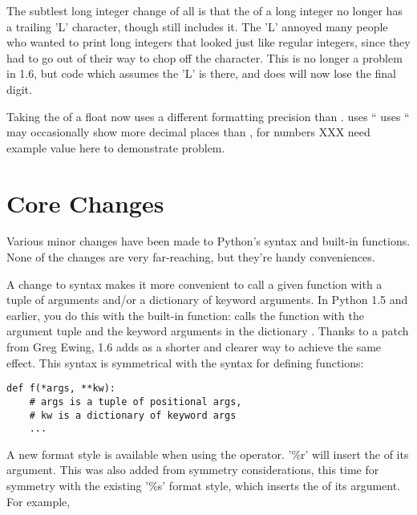 \documentclass{howto}
\begin{document}
{The subtlest long integer change of all is that the 
of a long integer no longer has a trailing 'L' character, though
 still includes it.  The 'L' annoyed many people who
wanted to print long integers that looked just like regular integers,
since they had to go out of their way to chop off the character.  This
is no longer a problem in 1.6, but code which assumes the 'L' is
there, and does  will now lose the final
digit.  

Taking the  of a float now uses a different
formatting precision than .   uses
``%
 uses ``%
 may occasionally show more decimal places than 
, for numbers 
XXX need example value here to demonstrate problem.


\section{Core Changes}

Various minor changes have been made to Python's syntax and built-in
functions.  None of the changes are very far-reaching, but they're
handy conveniences.

A change to syntax makes it more convenient to call a given function
with a tuple of arguments and/or a dictionary of keyword arguments.
In Python 1.5 and earlier, you do this with the 
built-in function:  calls the
function  with the argument tuple  and the
keyword arguments in the dictionary .  Thanks to a patch from
Greg Ewing, 1.6 adds  as a shorter
and clearer way to achieve the same effect.  This syntax is
symmetrical with the syntax for defining functions:

\begin{verbatim}
def f(*args, **kw):
    # args is a tuple of positional args,
    # kw is a dictionary of keyword args
    ...
\end{verbatim}

A new format style is available when using the \operator{\%} operator.
'\%r' will insert the  of its argument.  This was
also added from symmetry considerations, this time for symmetry with
the existing '\%s' format style, which inserts the  of
its argument.  For example, \code{'%
string containing \verb|'abc' abc|.

}}
\end{document}
